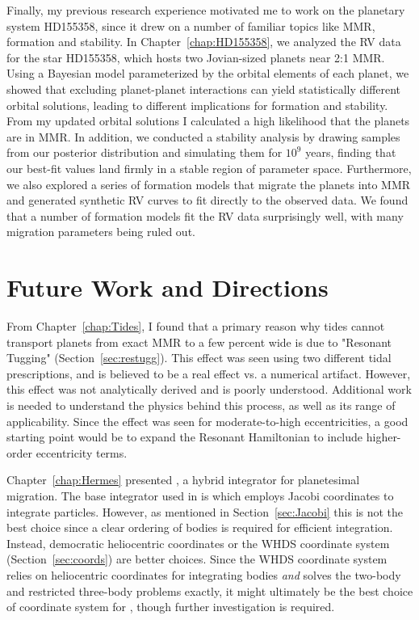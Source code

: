 Finally, my previous research experience motivated me to work on the planetary system HD155358, since it drew on a number of familiar topics like MMR, formation and stability. 
In Chapter~\ref{chap:HD155358}, we analyzed the RV data for the star HD155358, which hosts two Jovian-sized planets near 2:1 MMR. 
Using a Bayesian model parameterized by the orbital elements of each planet, we showed that excluding planet-planet interactions can yield statistically different orbital solutions, leading to different implications for formation and stability. 
From my updated orbital solutions I calculated a high likelihood that the planets are in MMR. 
In addition, we conducted a stability analysis by drawing samples from our posterior distribution and simulating them for $10^9$ years, finding that our best-fit values land firmly in a stable region of parameter space.
Furthermore, we also explored a series of formation models that migrate the planets into MMR and generated synthetic RV curves to fit directly to the observed data. 
We found that a number of formation models fit the RV data surprisingly well, with many migration parameters being ruled out.

\section{Future Work and Directions}
\label{sec:Future}
From Chapter~\ref{chap:Tides}, I found that a primary reason why tides cannot transport planets from exact MMR to a few percent wide is due to "Resonant Tugging" (Section~\ref{sec:restugg}).
This effect was seen using two different tidal prescriptions, and is believed to be a real effect vs. a numerical artifact. 
However, this effect was not analytically derived and is poorly understood. 
Additional work is needed to understand the physics behind this process, as well as its range of applicability.
Since the effect was seen for moderate-to-high eccentricities, a good starting point would be to expand the Resonant Hamiltonian to include higher-order eccentricity terms. 

Chapter~\ref{chap:Hermes} presented \hermes, a hybrid integrator for planetesimal migration. 
The base integrator used in \hermes is \whfast which employs Jacobi coordinates to integrate particles.
However, as mentioned in Section~\ref{sec:Jacobi} this is not the best choice since a clear ordering of bodies is required for efficient integration.
Instead, democratic heliocentric coordinates or the WHDS coordinate system (Section~\ref{sec:coords}) are better choices. 
Since the WHDS coordinate system relies on heliocentric coordinates for integrating bodies \textit{and} solves the two-body and restricted three-body problems exactly, it might ultimately be the best choice of coordinate system for \hermes, though further investigation is required. 

